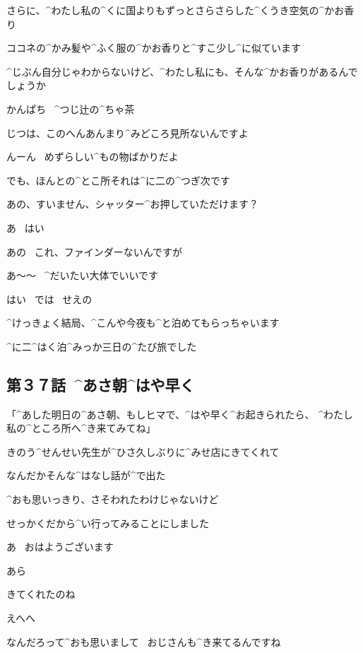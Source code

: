 \page
\Alpha さらに、^{わたし}{私}の^{くに}{国}よりもずっとさらさらした^{くうき}{空気}の^{かお}{香}り

\Alpha ココネの^{かみ}{髪}や^{ふく}{服}の^{かお}{香}りと^{すこ}{少}し^{に}{似}ています

\Alpha ^{じぶん}{自分}じゃわからないけど、^{わたし}{私}にも、そんな^{かお}{香}りがあるんでしょうか

\page
\Sign かんぱち
\ ^{つじ}{辻}の^{ちゃ}{茶}

\Kokone じつは、このへんあんまり^{みどころ}{見所}ないんですよ

\Alpha んーん
\ めずらしい^{もの}{物}ばかりだよ

\Alpha でも、ほんとの^{とこ}{所}それは^{に}{二}の^{つぎ}{次}です

\page
\Alpha あの、すいません、シャッター^{お}{押}していただけます？

\Person あ
\ はい

\Person あの
\ これ、ファインダーないんですが

\Alpha あ〜〜
\ ^{だいたい}{大体}でいいです

\Person はい
\ では
\ せえの

\page
\Alpha ^{けっきょく}{結局}、^{こんや}{今夜}も^{と}{泊}めてもらっちゃいます

\Alpha ^{に}{二}^{はく}{泊}^{みっか}{三日}の^{たび}{旅}でした


\subsection{第３７話\ ^{あさ}{朝}^{はや}{早}く}

\page[68]
\Sensei 「^{あした}{明日}の^{あさ}{朝}、もしヒマで、^{はや}{早}く^{お}{起}きられたら、
  ^{わたし}{私}の^{ところ}{所}へ^{き}{来}てみてね」

\Alpha きのう^{せんせい}{先生}が^{ひさ}{久}しぶりに^{みせ}{店}にきてくれて

\Alpha なんだかそんな^{はなし}{話}が^{で}{出}た

\page
\Alpha ^{おも}{思}いっきり、さそわれたわけじゃないけど

\Alpha せっかくだから^{い}{行}ってみることにしました

\page
\Alpha あ
\ おはようございます

\Sensei あら

\page
\Sensei きてくれたのね

\Alpha えへへ

\Alpha なんだろって^{おも}{思}いまして
\ おじさんも^{き}{来}てるんですね

